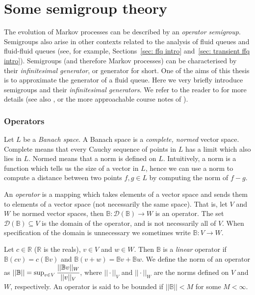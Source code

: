 \section{Some semigroup theory}
The evolution of Markov processes can be described by an \emph{operator semigroup}. Semigroups also arise in other contexts related to the analysis of fluid queues and fluid-fluid queues (see, for example, Sections~\ref{sec: ffq intro} and~\ref{sec: transient ffq intro}). Semigroups (and therefore Markov processes) can be characterised by their \emph{infinitesimal generator}, or generator for short. One of the aims of this thesis is to approximate the generator of a fluid queue. Here we very briefly introduce semigroups and their \emph{infinitesimal generators}. We refer to the reader to \cite{ethierkurtz} for more details (see also \cite{kallenberg}, or the more approachable course notes of \cite{shalizi}). 

\subsubsection{Operators}
Let \(L\) be a \emph{Banach space}. A Banach space is a \emph{complete, normed} vector space. Complete means that every Cauchy sequence of points in \(L\) has a limit which also lies in \(L\). Normed means that a norm is defined on \(L\). Intuitively, a norm is a function which tells us the size of a vector in \(L\), hence we can use a norm to compute a distance between two points \(f,g\in L\) by computing the norm of \(f-g\). 

An \emph{operator} is a mapping which takes elements of a vector space and sends them to elements of a vector space (not necessarily the same space). That is, let \(V\) and \(W\) be normed vector spaces, then \(\mathbb B:\mathcal D(\mathbb B)\to W\) is an operator. The set \(\mathcal D(\mathbb B)\subseteq V\) is the domain of the operator, and is not necessarily all of \(V\). When specification of the domain is unnecessary we sometimes write \(\mathbb B:V\to W\). 

Let \(c\in \mathbb R\) (\(\mathbb R\) is the reals), \(v\in V\) and \(w\in W\). Then \(\mathbb B\) is a \emph{linear} operator if \(\mathbb B(cv) = c(\mathbb Bv)\) and \(\mathbb B(v+w)=\mathbb Bv+\mathbb Bw\). We define the norm of an operator as \(||\mathbb B||=\sup_{v\in V}\cfrac{||\mathbb Bv||_W}{||v||_V}\), where \(||\cdot||_V\) and \(||\cdot||_W\) are the norms defined on \(V\) and \(W\), respectively.  An operator is said to be bounded if \(||\mathbb B||<M\) for some \(M<\infty\). 


